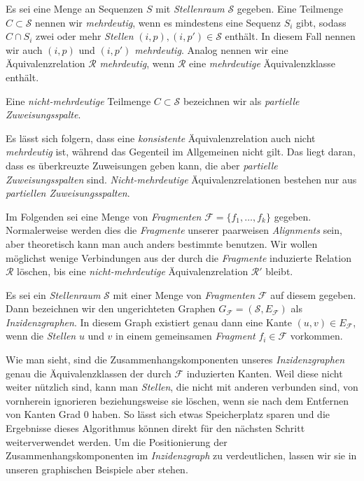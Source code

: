 \begin{definition}
	Es sei eine Menge an Sequenzen $S$ mit \emph{Stellenraum} $\mathcal{S}$ gegeben. Eine Teilmenge $C \subset \mathcal{S}$ nennen wir \emph{mehrdeutig}, wenn es mindestens eine Sequenz $S_i$ gibt, sodass $C \cap S_i$ zwei oder mehr \emph{Stellen} $(i,p), (i,p') \in \mathcal{S}$ enthält. In diesem Fall nennen wir auch $(i,p)$ und $(i,p')$ \emph{mehrdeutig}. Analog nennen wir eine Äquivalenzrelation $\mathcal{R}$ \emph{mehrdeutig}, wenn $\mathcal{R}$ eine \emph{mehrdeutige} Äquivalenzklasse enthält.
	
	Eine \emph{nicht-mehrdeutige} Teilmenge $C \subset \mathcal{S}$ bezeichnen wir als \emph{partielle Zuweisungsspalte}.
\end{definition}

Es lässt sich folgern, dass eine \emph{konsistente} Äquivalenzrelation auch nicht \emph{mehrdeutig} ist, während das Gegenteil im Allgemeinen nicht gilt. Das liegt daran, dass es überkreuzte Zuweisungen geben kann, die aber \emph{partielle Zuweisungsspalten} sind. \emph{Nicht-mehrdeutige} Äquivalenzrelationen bestehen nur aus \emph{partiellen Zuweisungsspalten}.

Im Folgenden sei eine Menge von \emph{Fragmenten} $\mathcal{F} = \{f_1, \dots, f_k\}$ gegeben. Normalerweise werden dies die \emph{Fragmente} unserer paarweisen \emph{Alignments} sein, aber theoretisch kann man auch anders bestimmte benutzen. Wir wollen möglichst wenige Verbindungen aus der durch die \emph{Fragmente} induzierte Relation $\mathcal{R}$ löschen, bis eine \emph{nicht-mehrdeutige} Äquivalenzrelation $\mathcal{R'}$ bleibt.

\begin{definition}[Inzidenzgraph]
	Es sei ein \emph{Stellenraum} $\mathcal{S}$ mit einer Menge von \emph{Fragmenten} $\mathcal{F}$ auf diesem gegeben. Dann bezeichnen wir den ungerichteten Graphen $G_{\mathcal{F}} = (\mathcal{S},E_{\mathcal{F}})$ als \emph{Inzidenzgraphen}. In diesem Graph existiert genau dann eine Kante $(u,v) \in E_{\mathcal{F}}$, wenn die \emph{Stellen} $u$ und $v$ in einem gemeinsamen \emph{Fragment} $f_i \in \mathcal{F}$ vorkommen.
\end{definition} 

Wie man sieht, sind die Zusammenhangskomponenten unseres \emph{Inzidenzgraphen} genau die Äquivalenzklassen der durch $\mathcal{F}$ induzierten Kanten. Weil diese nicht weiter nützlich sind, kann man \emph{Stellen}, die nicht mit anderen verbunden sind, von vornherein ignorieren beziehungsweise sie löschen, wenn sie nach dem Entfernen von Kanten Grad 0 haben. So lässt sich etwas Speicherplatz sparen und die Ergebnisse dieses Algorithmus können direkt für den nächsten Schritt weiterverwendet werden. Um die Positionierung der Zusammenhangskomponenten im \emph{Inzidenzgraph} zu verdeutlichen, lassen wir sie in unseren graphischen Beispiele aber stehen.

